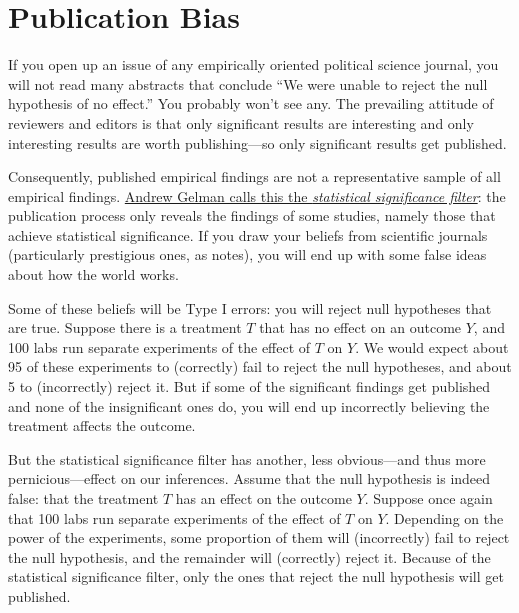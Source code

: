 \documentclass[
  12pt,
  oneside,openany]{book}
\begin{document}
\hypertarget{publication-bias}{%
\section{Publication Bias}\label{publication-bias}}

If you open up an issue of any empirically oriented political science journal, you will not read many abstracts that conclude ``We were unable to reject the null hypothesis of no effect.'' You probably won't see any. The prevailing attitude of reviewers and editors is that only significant results are interesting and only interesting results are worth publishing---so only significant results get published.

Consequently, published empirical findings are not a representative sample of all empirical findings. \href{http://andrewgelman.com/2011/09/10/the-statistical-significance-filter/}{Andrew Gelman calls this the \emph{statistical significance filter}}: the publication process only reveals the findings of some studies, namely those that achieve statistical significance. If you draw your beliefs from scientific journals (particularly prestigious ones, as \citet{ioannidis2008most} notes), you will end up with some false ideas about how the world works.

Some of these beliefs will be Type I errors: you will reject null hypotheses that are true. Suppose there is a treatment \(T\) that has no effect on an outcome \(Y\), and 100 labs run separate experiments of the effect of \(T\) on \(Y\). We would expect about 95 of these experiments to (correctly) fail to reject the null hypotheses, and about 5 to (incorrectly) reject it. But if some of the significant findings get published and none of the insignificant ones do, you will end up incorrectly believing the treatment affects the outcome.

But the statistical significance filter has another, less obvious---and thus more pernicious---effect on our inferences. Assume that the null hypothesis is indeed false: that the treatment \(T\) has an effect on the outcome \(Y\). Suppose once again that 100 labs run separate experiments of the effect of \(T\) on \(Y\). Depending on the power of the experiments, some proportion of them will (incorrectly) fail to reject the null hypothesis, and the remainder will (correctly) reject it. Because of the statistical significance filter, only the ones that reject the null hypothesis will get published.
\end{document}
